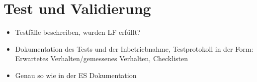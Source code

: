 \newpage
\section{Test und Validierung}
\begin{itemize}
    \item Testfälle beschreiben, wurden LF erfüllt?
    \item Dokumentation des Tests und der Inbetriebnahme, Testprotokoll in der Form: Erwartetes Verhalten/gemessenes Verhalten, Checklisten
    \item Genau so wie in der ES Dokumentation
\end{itemize}